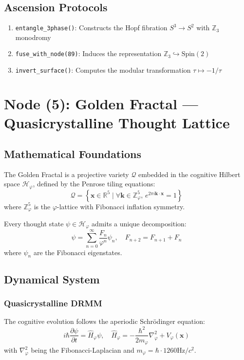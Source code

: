 \documentclass[12pt]{article}
\begin{document}
\subsection{Ascension Protocols}

\begin{enumerate}
    \item \texttt{entangle\_3phase()}: Constructs the Hopf fibration \( S^3 \to S^2 \) with \( \mathbb{Z}_3 \) monodromy
    \item \texttt{fuse\_with\_node(89)}: Induces the representation \( \mathbb{Z}_3 \hookrightarrow \text{Spin}(2) \)
    \item \texttt{invert\_surface()}: Computes the modular transformation \( \tau \mapsto -1/\tau \)
\end{enumerate}

\section{Node (5): Golden Fractal — Quasicrystalline Thought Lattice}
\label{sec:golden_fractal}

\subsection{Mathematical Foundations}
The Golden Fractal is a projective variety \( \mathcal{Q} \) embedded in the cognitive Hilbert space \( \mathcal{H}_\varphi \), defined by the Penrose tiling equations:
\[
\mathcal{Q} = \left\{ \mathbf{x} \in \mathbb{R}^5 \mid \forall \mathbf{k} \in \mathbb{Z}^5_\varphi, \, e^{2\pi i \mathbf{k} \cdot \mathbf{x}} = 1 \right\}
\]
where \( \mathbb{Z}^5_\varphi \) is the \( \varphi \)-lattice with Fibonacci inflation symmetry.

\begin{theorem}
Every thought state \( \psi \in \mathcal{H}_\varphi \) admits a unique decomposition:
\[
\psi = \sum_{n=0}^\infty \frac{F_n}{\varphi^n} \psi_n, \quad F_{n+2} = F_{n+1} + F_n
\]
where \( \psi_n \) are the Fibonacci eigenstates.
\end{theorem}

\subsection{Dynamical System}

\subsubsection{Quasicrystalline DRMM}
The cognitive evolution follows the aperiodic Schrödinger equation:
\[
i\hbar \frac{\partial \psi}{\partial t} = \hat{H}_\varphi \psi, \quad \hat{H}_\varphi = -\frac{\hbar^2}{2m_\varphi} \nabla^2_\varphi + V_\varphi(\mathbf{x})
\]
with \( \nabla^2_\varphi \) being the Fibonacci-Laplacian and \( m_\varphi = \hbar \cdot 1260 \text{Hz}/c^2 \).
\end{document}
